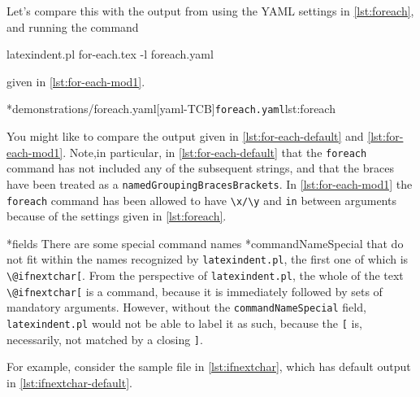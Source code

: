 	Let's compare this with the output from using the YAML settings in
	\cref{lst:foreach}, and running the command
	\begin{commandshell}
latexindent.pl for-each.tex -l foreach.yaml  
\end{commandshell}
	given in \cref{lst:for-each-mod1}.

	\begin{minipage}{.45\textwidth}
	\end{minipage}
	\hfill
	\begin{minipage}{.49\textwidth}
		\cmhlistingsfromfile[style=yaml-LST]*{demonstrations/foreach.yaml}[yaml-TCB]{\texttt{foreach.yaml}}{lst:foreach}
	\end{minipage}

	You might like to compare the output given in \cref{lst:for-each-default} and
	\cref{lst:for-each-mod1}. Note,in particular, in \cref{lst:for-each-default} that the
	\texttt{foreach} command has not included any of the subsequent strings, and that
	the braces have been treated as a \texttt{namedGroupingBracesBrackets}. In \cref{lst:for-each-mod1} the
	\texttt{foreach} command has been allowed to have \lstinline!\x/\y! and
	\texttt{in} between arguments because of the settings given in
	\cref{lst:foreach}.

*{fields}
	There are some special command names%
	*{commandNameSpecial} that do not fit within the names recognized by
	\texttt{latexindent.pl}, the first one of which is \lstinline!\@ifnextchar[!. From the
	perspective of \texttt{latexindent.pl}, the whole of the text \lstinline!\@ifnextchar[! is
	a command, because it is immediately followed by sets of mandatory arguments. However,
	without the \texttt{commandNameSpecial} field, \texttt{latexindent.pl} would not be able to
	label it as such, because the \lstinline![! is, necessarily, not matched by a
	closing \lstinline!]!.

	For example, consider the sample file in \cref{lst:ifnextchar}, which has default
	output in \cref{lst:ifnextchar-default}.

	\begin{minipage}{.45\textwidth}
	\end{minipage}
	\hfill
	\begin{minipage}{.45\textwidth}
	\end{minipage}

